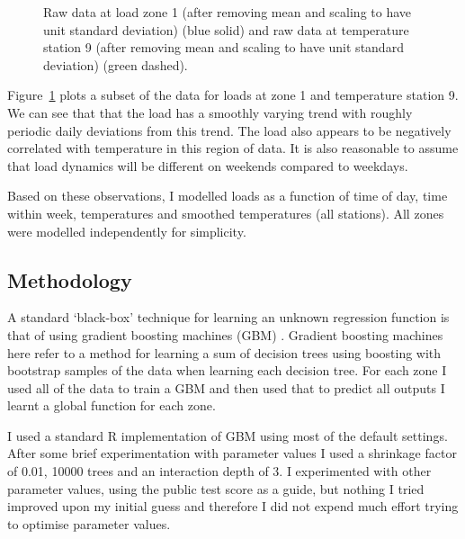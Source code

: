 \label{sec:gbm_init_anal}

\begin{figure}[ht]
  \begin{center}
    
  \end{center}
  \caption[Load data and corresponding temperature data.]{Raw data at load zone 1 (after removing mean and scaling to have unit standard deviation) (blue solid) and raw data at temperature station 9 (after removing mean and scaling to have unit standard deviation) (green dashed).}
  \label{fig:load_temp}
\end{figure}

Figure~\ref{fig:load_temp} plots a subset of the data for loads at zone 1 and temperature station 9.
We can see that that the load has a smoothly varying trend with roughly periodic daily deviations from this trend.
The load also appears to be negatively correlated with temperature in this region of data.
It is also reasonable to assume that load dynamics will be different on weekends compared to weekdays.

Based on these observations, I modelled loads as a function of time of day, time within week, temperatures and smoothed temperatures (all stations).
All zones were modelled independently for simplicity.

\subsection{Methodology}

A standard `black-box' technique for learning an unknown regression function is that of using gradient boosting machines (GBM) \citep[e.g. chapter 10 of][]{Hastie2009-hj}.
Gradient boosting machines here refer to a method for learning a sum of decision trees using boosting with bootstrap samples of the data when learning each decision tree.
For each zone I used all of the data to train a GBM and then used that to predict all outputs \ie I learnt a global function for each zone.

I used a standard R implementation of GBM using most of the default settings\footnotemark{}.
After some brief experimentation with parameter values I used a shrinkage factor of 0.01, 10000 trees and an interaction depth of 3.
I experimented with other parameter values, using the public test score as a guide, but nothing I tried improved upon my initial guess and therefore I did not expend much effort trying to optimise parameter values.

